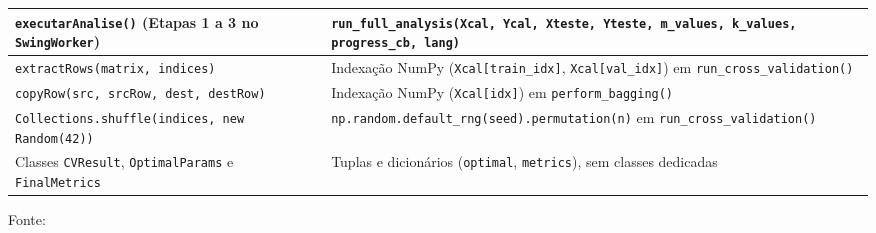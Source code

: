 \begin{quadro}[ht]
\begin{center}
\begin{threeparttable}
\begin{tabularx}{\textwidth}{|>{\raggedright\arraybackslash}X|>{\raggedright\arraybackslash}X|}
\texttt{executarAnalise()} (Etapas 1 a 3 no \texttt{SwingWorker}) & \texttt{run\_full\_analysis(Xcal, Ycal, Xteste, Yteste, m\_values, k\_values, progress\_cb, lang)} \\ \hline
\texttt{extractRows(matrix, indices)} & Indexação NumPy (\texttt{Xcal[train\_idx]}, \texttt{Xcal[val\_idx]}) em \texttt{run\_cross\_validation()} \\ \hline
\texttt{copyRow(src, srcRow, dest, destRow)} & Indexação NumPy (\texttt{Xcal[idx]}) em \texttt{perform\_bagging()} \\ \hline
\texttt{Collections.shuffle(indices, new Random(42))} & \texttt{np.random.default\_rng(seed).permutation(n)} em \texttt{run\_cross\_validation()} \\ \hline
Classes \texttt{CVResult}, \texttt{OptimalParams} e \texttt{FinalMetrics} & Tuplas e dicionários (\texttt{optimal}, \texttt{metrics}), sem classes dedicadas \\ \hline
\end{tabularx}
\begin{tablenotes}[flushleft]
\footnotesize
\item Fonte:~\oautor
\end{tablenotes}
\end{threeparttable}
\end{center}
\end{quadro}

